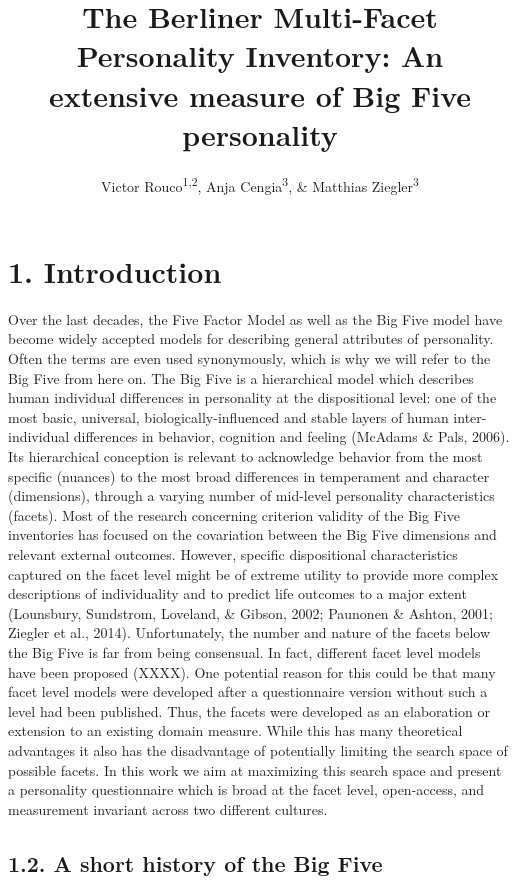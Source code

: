 \documentclass[,man]{apa6}
\title{The Berliner Multi-Facet Personality Inventory: An extensive measure of
Big Five personality}
\author{Victor Rouco\textsuperscript{1,2}, Anja Cengia\textsuperscript{3}, \&
Matthias Ziegler\textsuperscript{3}}
\date{}
\affiliation{
\vspace{0.5cm}
\textsuperscript{1} Universitat de Barcelona\\\textsuperscript{2} Institut de Neurociències de Barcelona\\\textsuperscript{3} Humboldt Universität zu Berlin}
\theoremstyle{definition}
\theoremstyle{definition}
\theoremstyle{definition}
\theoremstyle{remark}
\begin{document}
\maketitle

\hypertarget{introduction}{%
\section{1. Introduction}\label{introduction}}

Over the last decades, the Five Factor Model as well as the Big Five
model have become widely accepted models for describing general
attributes of personality. Often the terms are even used synonymously,
which is why we will refer to the Big Five from here on. The Big Five is
a hierarchical model which describes human individual differences in
personality at the dispositional level: one of the most basic,
universal, biologically-influenced and stable layers of human
inter-individual differences in behavior, cognition and feeling (McAdams
\& Pals, 2006). Its hierarchical conception is relevant to acknowledge
behavior from the most specific (nuances) to the most broad differences
in temperament and character (dimensions), through a varying number of
mid-level personality characteristics (facets). Most of the research
concerning criterion validity of the Big Five inventories has focused on
the covariation between the Big Five dimensions and relevant external
outcomes. However, specific dispositional characteristics captured on
the facet level might be of extreme utility to provide more complex
descriptions of individuality and to predict life outcomes to a major
extent (Lounsbury, Sundstrom, Loveland, \& Gibson, 2002; Paunonen \&
Ashton, 2001; Ziegler et al., 2014). Unfortunately, the number and
nature of the facets below the Big Five is far from being consensual. In
fact, different facet level models have been proposed (XXXX). One
potential reason for this could be that many facet level models were
developed after a questionnaire version without such a level had been
published. Thus, the facets were developed as an elaboration or
extension to an existing domain measure. While this has many theoretical
advantages it also has the disadvantage of potentially limiting the
search space of possible facets. In this work we aim at maximizing this
search space and present a personality questionnaire which is broad at
the facet level, open-access, and measurement invariant across two
different cultures.

\hypertarget{a-short-history-of-the-big-five}{%
\subsection{1.2. A short history of the Big
Five}\label{a-short-history-of-the-big-five}}
\end{document}
